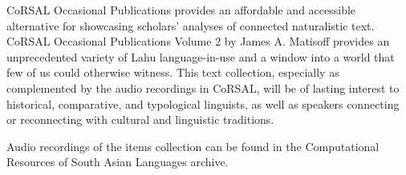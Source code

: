\clearpage{\thispagestyle{empty}\cleardoublepage}
CoRSAL Occasional Publications provides an affordable and accessible
alternative for showcasing scholars’ analyses of connected
naturalistic text.  CoRSAL Occasional Publications Volume 2 by James
A. Matisoff provides an unprecedented variety of Lahu
language-in-use and a window into a world that few of us could
otherwise witness.  This text collection, especially as complemented
by the audio recordings in CoRSAL, will be of lasting interest to
historical, comparative, and typological linguists, as well as
speakers connecting or reconnecting with cultural and linguistic
traditions.

Audio recordings of the items collection can be found in the
Computational Resources of South Asian Languages archive.

